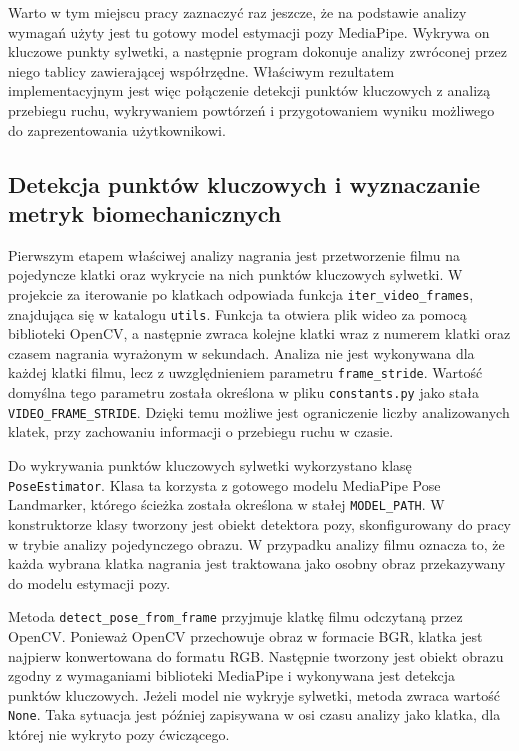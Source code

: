 Warto w tym miejscu pracy zaznaczyć raz jeszcze, że na podstawie analizy wymagań użyty jest tu gotowy model estymacji pozy MediaPipe. Wykrywa on kluczowe punkty sylwetki, a następnie program dokonuje analizy zwróconej przez niego tablicy zawierającej współrzędne. Właściwym rezultatem implementacyjnym jest więc połączenie detekcji punktów kluczowych z analizą przebiegu ruchu, wykrywaniem powtórzeń i przygotowaniem wyniku możliwego do zaprezentowania użytkownikowi.

\subsection{Detekcja punktów kluczowych i wyznaczanie metryk biomechanicznych}

Pierwszym etapem właściwej analizy nagrania jest przetworzenie filmu na pojedyncze klatki oraz wykrycie na nich punktów kluczowych sylwetki. W projekcie za iterowanie po klatkach odpowiada funkcja \texttt{iter\_video\_frames}, znajdująca się w katalogu \texttt{utils}. Funkcja ta otwiera plik wideo za pomocą biblioteki OpenCV, a następnie zwraca kolejne klatki wraz z numerem klatki oraz czasem nagrania wyrażonym w sekundach. Analiza nie jest wykonywana dla każdej klatki filmu, lecz z uwzględnieniem parametru \texttt{frame\_stride}. Wartość domyślna tego parametru została określona w pliku \texttt{constants.py} jako stała \texttt{VIDEO\_FRAME\_STRIDE}. Dzięki temu możliwe jest ograniczenie liczby analizowanych klatek, przy zachowaniu informacji o przebiegu ruchu w czasie.

Do wykrywania punktów kluczowych sylwetki wykorzystano klasę \texttt{PoseEstimator}. Klasa ta korzysta z gotowego modelu MediaPipe Pose Landmarker, którego ścieżka została określona w stałej \texttt{MODEL\_PATH}. W konstruktorze klasy tworzony jest obiekt detektora pozy, skonfigurowany do pracy w trybie analizy pojedynczego obrazu. W przypadku analizy filmu oznacza to, że każda wybrana klatka nagrania jest traktowana jako osobny obraz przekazywany do modelu estymacji pozy.

Metoda \texttt{detect\_pose\_from\_frame} przyjmuje klatkę filmu odczytaną przez OpenCV. Ponieważ OpenCV przechowuje obraz w formacie BGR, klatka jest najpierw konwertowana do formatu RGB. Następnie tworzony jest obiekt obrazu zgodny z wymaganiami biblioteki MediaPipe i wykonywana jest detekcja punktów kluczowych. Jeżeli model nie wykryje sylwetki, metoda zwraca wartość \texttt{None}. Taka sytuacja jest później zapisywana w osi czasu analizy jako klatka, dla której nie wykryto pozy ćwiczącego.

